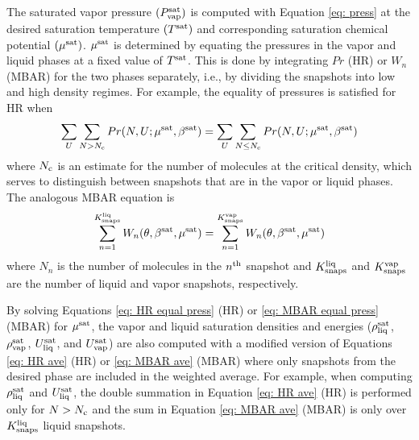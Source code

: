 \documentclass[journal=jced,manuscript=article]{achemso}
\begin{document}
The saturated vapor pressure $(P_{\rm vap}^{\rm sat})$ is computed with Equation \ref{eq: press} at the desired saturation temperature $(T^{\rm sat})$ and corresponding saturation chemical potential $(\mu^{\rm sat})$. $\mu^{\rm sat}$ is determined by equating the pressures in the vapor and liquid phases at a fixed value of $T^{\rm sat}$. This is done by integrating $Pr$ (HR) or $W_{n}$ (MBAR) for the two phases separately, i.e., by dividing the snapshots into low and high density regimes. For example, the equality of pressures is satisfied for HR when
\begin{eqnarray} \label{eq: HR equal press}
\sum_{U} \sum_{N > N_{\rm c}} Pr(N,U;\mu^{\rm sat},\beta^{\rm sat}) = \sum_{U} \sum_{N \leq N_{\rm c}} Pr(N,U;\mu^{\rm sat},\beta^{\rm sat})
\end{eqnarray}
where $N_{\rm c}$ is an estimate for the number of molecules at the critical density, which serves to distinguish between snapshots that are in the vapor or liquid phases. The analogous MBAR equation is
\begin{eqnarray} \label{eq: MBAR equal press}
\sum_{n=1}^{K^{\rm liq}_{\rm snaps}} W_{n}(\theta,\beta^{\rm sat},\mu^{\rm sat}) = \sum_{n=1}^{K^{\rm vap}_{\rm snaps}} W_{n}(\theta,\beta^{\rm sat},\mu^{\rm sat})
\end{eqnarray}
where $N_n$ is the number of molecules in the $n^{\rm th}$ snapshot and $K^{\rm liq}_{\rm snaps}$ and $K^{\rm vap}_{\rm snaps}$ are the number of liquid and vapor snapshots, respectively.

By solving Equations \ref{eq: HR equal press} (HR) or \ref{eq: MBAR equal press} (MBAR) for $\mu^{\rm sat}$, the vapor and liquid saturation densities and energies ($\rho_{\rm liq}^{\rm sat}$, $\rho_{\rm vap}^{\rm sat}$, $U_{\rm liq}^{\rm sat}$, and $U_{\rm vap}^{\rm sat}$) are also computed with a modified version of Equations \ref{eq: HR ave} (HR) or \ref{eq: MBAR ave} (MBAR) where only snapshots from the desired phase are included in the weighted average. For example, when computing $\rho_{\rm liq}^{\rm sat}$ and $U_{\rm liq}^{\rm sat}$, the double summation in Equation \ref{eq: HR ave} (HR) is performed only for $N > N_{\rm c}$ and the sum in Equation \ref{eq: MBAR ave} (MBAR) is only over $K^{\rm liq}_{\rm snaps}$ liquid snapshots.
\end{document}

